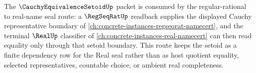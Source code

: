 The $\CauchyEquivalenceSetoidUp$ packet is consumed by the regular-rational to real-name seal route: a $\RegSeqRatUp$ readback supplies the displayed Cauchy representative boundary of \autoref{ch:concrete-instances-regseqrat-namecert}, and the terminal $\RealUp$ classifier of \autoref{ch:concrete-instances-real-namecert} can then read equality only through that setoid boundary. This route keeps the setoid as a finite dependency row for the Real seal rather than as host quotient equality, selected representatives, countable choice, or ambient real completeness.
